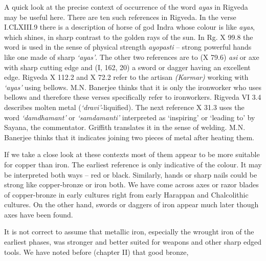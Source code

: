 A quick look at the precise context of occurrence of the word \textit{ayas} in Rigveda may be useful here. There are ten such references in Rigveda. In the verse I.CLXIII.9 there is a description of horse of god Indra whose colour is like \textit{ayas}, which shines, in sharp contrast to the golden rays of the sun. In Rg. X 99.8 the word is used in the sense of physical strength \textit{ayopasti} – strong powerful hands like one made of sharp \textit{‘ayas’}. The other two references are to (X 79.6) \textit{asi} or axe with sharp cutting edge and (I, 162, 20) a sword or dagger having an excellent edge. Rigveda X 112.2 and X 72.2 refer to the artisan \textit{(Karmar)} working with \textit{‘ayas’} using bellows. M.N. Banerjee thinks that it is only the ironworker who uses bellows and therefore these verses specifically refer to ironworkers. Rigveda VI 3.4 describes molten metal (\textit{‘dravi’}-liquified). The next reference X 31.3 uses the word \textit{‘damdhamant’} or \textit{‘samdamanti’} interpreted as ‘inspiring’ or ‘leading to’ by Sayana, the commentator. Griffith translates it in the sense of welding. M.N. Banerjee thinks that it indicates joining two pieces of metal after heating them.

If we take a close look at these contexts most of them appear to be more suitable for copper than iron. The earliest reference is only indicative of the colour. It may be interpreted both ways – red or black. Similarly, hands or sharp nails could be strong like copper-bronze or iron both. We have come across axes or razor blades of copper-bronze in early cultures right from early Harappan and Chalcolithic cultures. On the other hand, swords or daggers of iron appear much later though axes have been found.

It is not correct to assume that metallic iron, especially the wrought iron of the earliest phases, was stronger and better suited for weapons and other sharp edged tools. We have noted before (chapter II) that good bronze,

